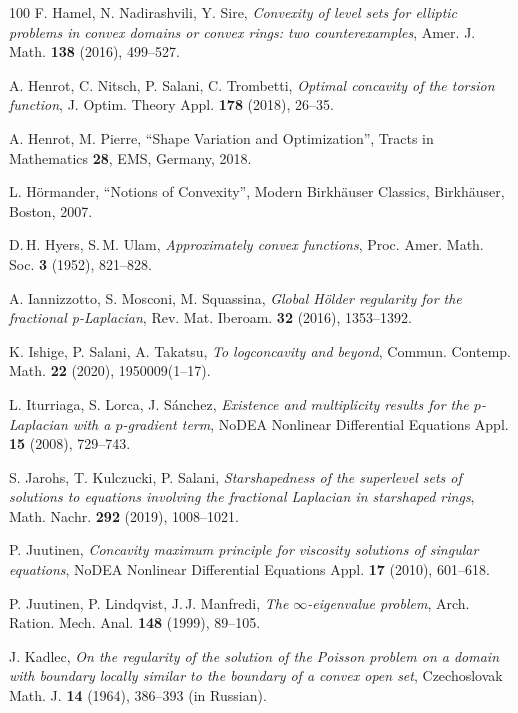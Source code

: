 \documentclass[11pt, reqno]{amsart}
\theoremstyle{definition}
\numberwithin{equation}{section}
\begin{document}
\begin{thebibliography}{100}
 F. Hamel, N. Nadirashvili, Y. Sire,
\emph{Convexity of level sets for elliptic problems in convex domains or convex rings: two counterexamples},
Amer. J. Math. \textbf{138} (2016), %
499--527.

 A. Henrot, C. Nitsch, P. Salani, C. Trombetti,
\emph{Optimal concavity of the torsion function},
J. Optim. Theory Appl. \textbf{178} (2018), %
26--35.

 A. Henrot, M. Pierre,
``Shape Variation and Optimization'',
Tracts in Mathematics \textbf{28}, EMS, Germany, 2018.

 L. Hörmander,
``Notions of Convexity'',
Modern Birkhäuser Classics, Birkhäuser, Boston, 2007.

 D.$\,$H. Hyers, S.$\,$M. Ulam,
\emph{Approximately convex functions},
Proc. Amer. Math. Soc. \textbf{3} (1952), %
821--828.

 A. Iannizzotto, S. Mosconi, M. Squassina,
\emph{Global Hölder regularity for the fractional p-Laplacian},
Rev. Mat. Iberoam. \textbf{32} (2016), %
1353--1392.

 K. Ishige, P. Salani, A. Takatsu,
\emph{To logconcavity and beyond},
Commun. Contemp. Math. \textbf{22} (2020), 
1950009(1--17). 

 L. Iturriaga, S. Lorca, J. Sánchez, 
\emph{Existence and multiplicity results for the $p$-Laplacian with a $p$-gradient term},
NoDEA Nonlinear Differential Equations Appl. \textbf{15} (2008), 
729--743.

 S. Jarohs, T. Kulczucki, P. Salani,
\emph{Starshapedness of the superlevel sets of solutions to equations involving the fractional Laplacian in starshaped rings},
Math. Nachr. \textbf{292} (2019), %
1008--1021.

 P. Juutinen,
\emph{Concavity maximum principle for viscosity solutions of singular equations},
NoDEA Nonlinear Differential Equations Appl. \textbf{17} (2010), %
601--618.

 P. Juutinen, P. Lindqvist, J.$\,$J. Manfredi,
\emph{The $\infty$-eigenvalue problem},
Arch. Ration. Mech. Anal. \textbf{148} (1999), %
89--105.

 J. Kadlec,
\emph{On the regularity of the solution of the Poisson problem on a domain with boundary locally similar to the boundary of a convex open set},
Czechoslovak Math. J. \textbf{14} (1964), %
386--393 (in Russian).


\end{thebibliography}
\end{document}
